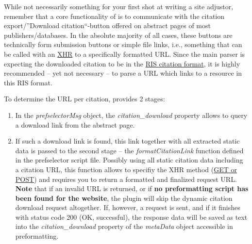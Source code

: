 \documentclass[
a4paper,
12pt,
]
{article}
\begin{document}
While not necessarily something for your first shot at writing a site adjustor, remember that a core functionality of {\plgname} is to communicate with the citation export/''Download citation``-button offered on abstract pages of most publishers/databases. In the absolute majority of all cases, these buttons are technically form submission buttons or simple file links, i.e., something that can be called with an \href{https://developer.mozilla.org/en-US/docs/Web/API/XMLHttpRequest}{XHR} to a specifically formatted URL.
Since the main parser is expecting the downloaded citation to be in the \href{https://en.wikipedia.org/wiki/RIS_(file_format)}{RIS citation format}, it is highly recommended -- yet not necessary -- to parse a URL which links to a resource in this RIS format.\par

To determine the URL per citation, {\plgname} provides 2 stages:
\begin{enumerate}
 \item In the \textit{prefselectorMsg} object, the \textit{citation\_download} property allows to query a download link from the abstract page.
 \item If such a download link is found, this link together with all extracted static data is passed to the second stage -- the \textit{formatCitationLink} function defined in the prefselector script file. Possibly using all static citation data including a citation URL, this function allows to specifiy the XHR method (\href{https://en.wikipedia.org/wiki/XMLHttpRequest#The_open_method}{GET or POST}) and requires you to return a formatted and finalized  request URL. \textbf{Note} that if an invalid URL is returned, or if \textbf{no preformatting script has been found for the website}, the plugin will skip the dynamic citation download request altogether.
 If, however, a request is sent, and if it finishes with status code 200 (OK, successful), the response data will be saved as text into the \textit{citation\_download} property of the \textit{metaData} object accessible in preformatting. 
\end{enumerate}
\end{document}
